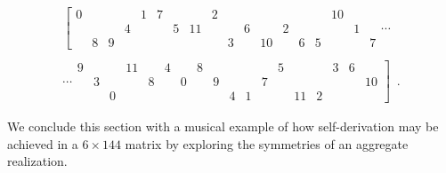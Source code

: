\begin{example}
\begin{multline}
        \left[
        \begin{array}{cccccccccccc|cccccc}
        	0 &&&& 1 & 7 &&& 2 &&&&&&& 10 && \\
        	&&& 4 &&& 5 & 11 &&& 6 && 2 &&&& 1 & \\
        	& 8 & 9 &&&&&&& 3 && 10 && 6 & 5 &&& 7
        \end{array}
        \right. \cdots \\\\
        \cdots \left.
        \begin{array}{cccccc|cccccccccccc}
        	9 &&& 11 && 4 && 8 &&&&& 5 &&& 3 & 6 & \\
        	& 3 &&& 8 && 0 && 9 &&& 7 &&&&&& 10 \\
        	&& 0 &&&&&&& 4 & 1 &&& 11 & 2 &&&
        \end{array}
        \right] \enspace.
    \end{multline}
\end{example}

We conclude this section with a musical example of how self-derivation may be achieved in a $6 \times 144$ matrix by exploring the symmetries of an aggregate realization.


